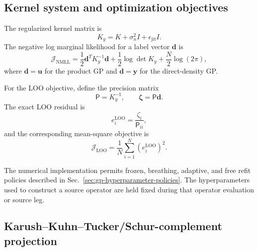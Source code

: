 \documentclass[
  11pt,
  letterpaper,
  onehalfspacing,
  normalmargins,
  equalmargins,
  oneside
]{ut-thesis}
\begin{document}
\subsection{Kernel system and optimization objectives}
\label{appsubsec:gp-objectives}

The regularized kernel matrix is
\begin{equation}
K_y
=
K+\sigma_n^2I+\epsilon_{\mathrm{jit}}I.
\label{appeq:appendix-Ky}
\end{equation}
The negative log marginal likelihood for a label vector \(\mathbf d\) is
\begin{equation}
\mathcal J_{\mathrm{NMLL}}
=
\frac{1}{2}
\mathbf d^T K_y^{-1}\mathbf d
+
\frac{1}{2}\log\det K_y
+
\frac{N}{2}\log(2\pi),
\label{appeq:appendix-nmll}
\end{equation}
where \(\mathbf d=\mathbf u\) for the product GP and
\(\mathbf d=\mathbf y\) for the direct-density GP.

For the LOO objective, define the precision matrix
\begin{equation}
\mathsf P
=
K_y^{-1},
\qquad
\boldsymbol\zeta
=
\mathsf P\mathbf d.
\label{appeq:appendix-precision}
\end{equation}
The exact LOO residual is
\begin{equation}
e_i^{\mathrm{LOO}}
=
\frac{
\zeta_i
}{
\mathsf P_{ii}
},
\label{appeq:appendix-loo}
\end{equation}
and the corresponding mean-square objective is
\[
\mathcal J_{\mathrm{LOO}}
=
\frac{1}{N}
\sum_{i=1}^{N}
\left(
e_i^{\mathrm{LOO}}
\right)^2.
\]

The numerical implementation permits frozen, breathing, adaptive, and free refit
policies described in Sec.~\ref{sec:gp-hyperparameter-policies}.  The
hyperparameters used to construct a source operator are held fixed during
that operator evaluation or source leg.

\subsection{Karush--Kuhn--Tucker/Schur-complement projection}
\label{appsubsec:kkt-projection}
\end{document}
